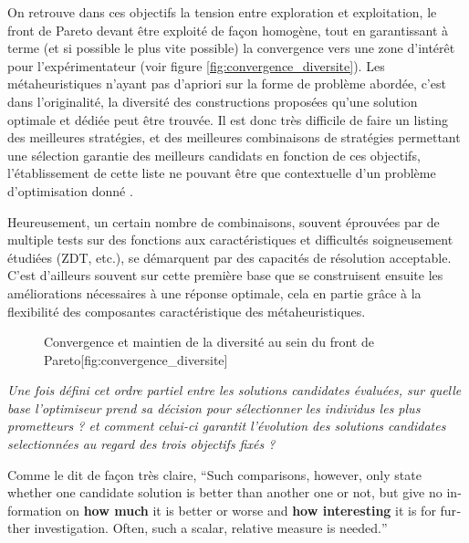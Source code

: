 On retrouve dans ces objectifs la tension entre exploration et exploitation, le front de Pareto devant être exploité de façon homogène, tout en garantissant à terme (et si possible le plus vite possible) la convergence vers une zone d'intérêt pour l'expérimentateur (voir figure \ref{fig:convergence_diversite}). Les métaheuristiques n'ayant pas d'apriori sur la forme de problème abordée, c'est dans l'originalité, la diversité des constructions proposées qu'une solution optimale et dédiée peut être trouvée. Il est donc très difficile de faire un listing des meilleures stratégies, et des meilleures combinaisons de stratégies permettant une sélection garantie des meilleurs candidats en fonction de ces objectifs, l'établissement de cette liste ne pouvant être que contextuelle d'un problème d'optimisation donné .

Heureusement, un certain nombre de combinaisons, souvent éprouvées par de multiple tests sur des fonctions aux caractéristiques et difficultés soigneusement étudiées (ZDT, etc.), se démarquent par des capacités de résolution acceptable. C'est d'ailleurs souvent sur cette première base que se construisent ensuite les améliorations nécessaires à une réponse optimale, cela en partie grâce à la flexibilité des composantes caractéristique des métaheuristiques.

\begin{figure}[!htbp]
  \begin{sidecaption}{Convergence et maintien de la diversité au sein du front de Pareto}[fig:convergence_diversite]
  \centering
  \qquad
 \end{sidecaption}
\end{figure}

\textit{Une fois défini cet ordre partiel entre les solutions candidates évaluées, sur quelle base l'optimiseur prend sa décision pour sélectionner les individus les plus prometteurs ? et comment celui-ci garantit l'évolution des solutions candidates selectionnées au regard des trois objectifs fixés ?}

Comme le dit de façon très claire,\textcite[94]{Weise2011} \foreignquote{english}{Such comparisons, however, only state whether one candidate solution is better than another one or not, but give no information on \textbf{how much} it is better or worse and \textbf{how interesting} it is for further investigation. Often, such a scalar, relative measure is needed.}

